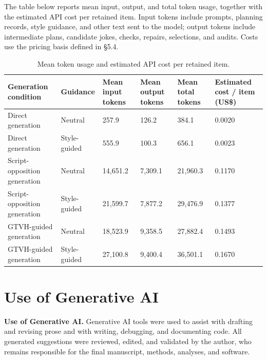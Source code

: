 \documentclass[11pt]{article}
\begin{document}
The table below reports mean input, output, and total token usage, together with the estimated API cost per retained item. Input tokens include prompts, planning records, style guidance, and other text sent to the model; output tokens include intermediate plans, candidate jokes, checks, repairs, selections, and audits. Costs use the pricing basis defined in §5.4.

\begin{table}[t]
\centering
\caption{Mean token usage and estimated API cost per retained item.}\label{tab:token-cost}
\scriptsize\begin{tabularx}{\textwidth}{YYYYYY}
\toprule\noalign{}
Generation condition & Guidance & Mean input tokens & Mean output tokens & Mean total tokens & Estimated cost / item (US\$) \\
\midrule\noalign{}

Direct generation & Neutral & 257.9 & 126.2 & 384.1 & 0.0020 \\
Direct generation & Style-guided & 555.9 & 100.3 & 656.1 & 0.0023 \\
Script-opposition generation & Neutral & 14,651.2 & 7,309.1 & 21,960.3 & 0.1170 \\
Script-opposition generation & Style-guided & 21,599.7 & 7,877.2 & 29,476.9 & 0.1377 \\
GTVH-guided generation & Neutral & 18,523.9 & 9,358.5 & 27,882.4 & 0.1493 \\
GTVH-guided generation & Style-guided & 27,100.8 & 9,400.4 & 36,501.1 & 0.1670 \\
\bottomrule
\end{tabularx}\end{table}

\section*{Use of Generative AI}

\textbf{Use of Generative AI.} Generative AI tools were used to assist with drafting and revising prose and with writing, debugging, and documenting code. All generated suggestions were reviewed, edited, and validated by the author, who remains responsible for the final manuscript, methods, analyses, and software.


\end{document}
